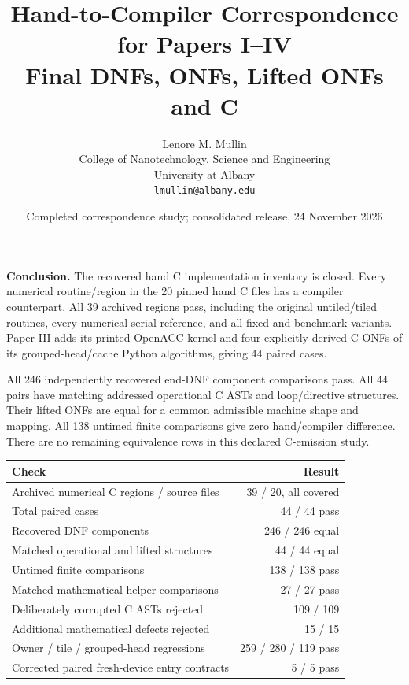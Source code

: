 
\title{Hand-to-Compiler Correspondence for Papers I--IV\\Final DNFs, ONFs, Lifted ONFs and C}
\author{Lenore M. Mullin\\College of Nanotechnology, Science and Engineering\\University at Albany\\\texttt{lmullin@albany.edu}}
\date{Completed correspondence study; consolidated release, 24 November 2026}
\maketitle
\textbf{Conclusion.} The recovered hand C implementation inventory is closed.
Every numerical routine/region in the 20 pinned hand C files has a compiler
counterpart. All 39 archived regions pass, including the original untiled/tiled
routines, every numerical serial reference, and all fixed and benchmark variants.
Paper III adds its printed OpenACC kernel and four explicitly derived C ONFs of
its grouped-head/cache Python algorithms, giving 44 paired cases.

All 246 independently recovered end-DNF component comparisons pass. All 44 pairs
have matching addressed operational C ASTs and loop/directive structures. Their
lifted ONFs are equal for a common admissible machine shape and mapping. All
138 untimed finite comparisons give zero hand/compiler difference. There are no
remaining equivalence rows in this declared C-emission study.

\begin{center}\begin{tabular}{lr}\toprule
Check & Result\\\midrule
Archived numerical C regions / source files & 39 / 20, all covered\\
Total paired cases & 44 / 44 pass\\
Recovered DNF components & 246 / 246 equal\\
Matched operational and lifted structures & 44 / 44 equal\\
Untimed finite comparisons & 138 / 138 pass\\
Matched mathematical helper comparisons & 27 / 27 pass\\
Deliberately corrupted C ASTs rejected & 109 / 109\\
Additional mathematical defects rejected & 15 / 15\\
Owner / tile / grouped-head regressions & 259 / 280 / 119 pass\\
Corrected paired fresh-device entry contracts & 5 / 5 pass\\\bottomrule
\end{tabular}\end{center}

